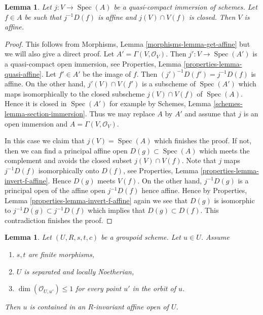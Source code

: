 \documentclass{stacks-project}
\theoremstyle{plain}
\newtheorem{lemma}[subsection]{Lemma}
\theoremstyle{definition}
\theoremstyle{remark}
\numberwithin{equation}{subsection}
\def\Spec{\mathop{\mathrm{Spec}}}
\begin{document}
\begin{lemma}
\label{lemma-get-affine}
Let $j : V \to \Spec(A)$ be a quasi-compact immersion of schemes.
Let $f \in A$ be such that $j^{-1}D(f)$ is affine and $j(V) \cap V(f)$
is closed. Then $V$ is affine.
\end{lemma}

\begin{proof}
This follows from Morphisms, Lemma \ref{morphisms-lemma-get-affine}
but we will also give a direct proof.
Let $A' = \Gamma(V, \mathcal{O}_V)$. Then $j' : V \to \Spec(A')$ is a
quasi-compact open immersion, see
Properties, Lemma \ref{properties-lemma-quasi-affine}.
Let $f' \in A'$ be the image of $f$. Then $(j')^{-1}D(f') = j^{-1}D(f)$
is affine. On the other hand, $j'(V) \cap V(f')$ is a subscheme of
$\Spec(A')$ which maps isomorphically to the closed subscheme
$j(V) \cap V(f)$ of $\Spec(A)$. Hence it is closed in $\Spec(A')$
for example by Schemes, Lemma \ref{schemes-lemma-section-immersion}.
Thus we may replace $A$ by $A'$ and assume that $j$ is an open immersion
and $A = \Gamma(V, \mathcal{O}_V)$.

\medskip\noindent
In this case we claim that $j(V) = \Spec(A)$ which finishes the proof.
If not, then we can find a principal affine open $D(g) \subset \Spec(A)$
which meets the complement and avoids the closed subset $j(V) \cap V(f)$.
Note that $j$ maps $j^{-1}D(f)$ isomorphically onto $D(f)$, see
Properties, Lemma \ref{properties-lemma-invert-f-affine}.
Hence $D(g)$ meets $V(f)$. On the other hand, $j^{-1}D(g)$
is a principal open of the affine open $j^{-1}D(f)$ hence affine.
Hence by
Properties, Lemma \ref{properties-lemma-invert-f-affine}
again we see that $D(g)$ is isomorphic to $j^{-1}D(g) \subset j^{-1}D(f)$
which implies that $D(g) \subset D(f)$. This contradiction finishes
the proof.
\end{proof}

\begin{lemma}
\label{lemma-find-affine-codimension-1}
Let $(U, R, s, t, c)$ be a groupoid scheme. Let $u \in U$. Assume
\begin{enumerate}
\item $s, t$ are finite morphisms,
\item $U$ is separated and locally Noetherian,
\item $\dim(\mathcal{O}_{U, u'}) \leq 1$ for every point $u'$
in the orbit of $u$.
\end{enumerate}
Then $u$ is contained in an $R$-invariant affine open of $U$.
\end{lemma}
\end{document}

